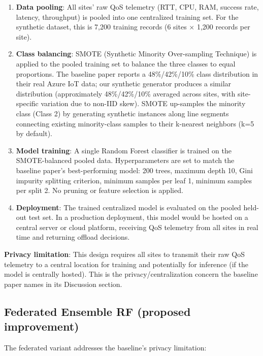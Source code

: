\begin{enumerate}
  \item \textbf{Data pooling}: All sites' raw QoS telemetry (RTT, CPU, RAM, success rate, latency, throughput) is pooled into one centralized training set. For the synthetic dataset, this is 7,200 training records (6 sites $\times$ 1,200 records per site).
  
  \item \textbf{Class balancing}: SMOTE (Synthetic Minority Over-sampling Technique) is applied to the pooled training set to balance the three classes to equal proportions. The baseline paper reports a 48\%/42\%/10\% class distribution in their real Azure IoT data; our synthetic generator produces a similar distribution (approximately 48\%/42\%/10\% averaged across sites, with site-specific variation due to non-IID skew). SMOTE up-samples the minority class (Class 2) by generating synthetic instances along line segments connecting existing minority-class samples to their k-nearest neighbors (k=5 by default).
  
  \item \textbf{Model training}: A single Random Forest classifier is trained on the SMOTE-balanced pooled data. Hyperparameters are set to match the baseline paper's best-performing model: 200 trees, maximum depth 10, Gini impurity splitting criterion, minimum samples per leaf 1, minimum samples per split 2. No pruning or feature selection is applied.
  
  \item \textbf{Deployment}: The trained centralized model is evaluated on the pooled held-out test set. In a production deployment, this model would be hosted on a central server or cloud platform, receiving QoS telemetry from all sites in real time and returning offload decisions.
\end{enumerate}

\textbf{Privacy limitation}: This design requires all sites to transmit their raw QoS telemetry to a central location for training and potentially for inference (if the model is centrally hosted). This is the privacy/centralization concern the baseline paper names in its Discussion section.

\subsection{Federated Ensemble RF (proposed improvement)}
\label{subsec:federated}

The federated variant addresses the baseline's privacy limitation:


